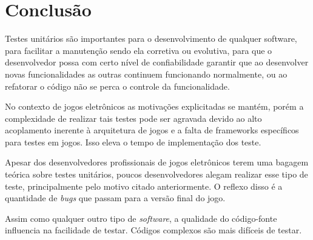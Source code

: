 \chapter[Conclusão]{Conclusão}

Testes unitários são importantes para o desenvolvimento de qualquer software, para facilitar a manutenção sendo ela corretiva ou evolutiva, para que o desenvolvedor possa com certo nível de confiabilidade garantir que ao desenvolver novas funcionalidades as outras continuem funcionando normalmente, ou ao refatorar o código não se perca o controle da funcionalidade.

No contexto de jogos eletrônicos as motivações explicitadas se mantém, porém a complexidade de realizar tais testes pode ser agravada devido ao alto acoplamento inerente à arquitetura de jogos \cite{gregory} e a falta de frameworks específicos para testes em jogos. Isso eleva o tempo de implementação dos teste.

Apesar dos desenvolvedores profissionais de jogos eletrônicos terem uma bagagem teórica sobre testes unitários, poucos desenvolvedores alegam realizar esse tipo de teste, principalmente pelo motivo citado anteriormente. O reflexo disso é a quantidade de \textit{bugs} que passam para a versão final do jogo.

Assim como qualquer outro tipo de \textit{software}, a qualidade do código-fonte influencia na facilidade de testar. Códigos complexos são mais difíceis de testar.